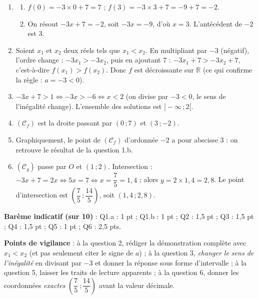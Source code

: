 \documentclass[11pt]{article}
\begin{document}
\begin{corrige}
\begin{enumerate}
\item \begin{enumerate}
\item $f(0)=-3\times 0+7=7$ ; $f(3)=-3\times 3+7=-9+7=-2$.
\item On résout $-3x+7=-2$, soit $-3x=-9$, d'où $x=3$. L'antécédent de $-2$ est $3$.
\end{enumerate}
\item Soient $x_1$ et $x_2$ deux réels tels que $x_1<x_2$. En multipliant par $-3$ (négatif), l'ordre change : $-3x_1>-3x_2$, puis en ajoutant $7$ : $-3x_1+7>-3x_2+7$, c'est-à-dire $f(x_1)>f(x_2)$. Donc $f$ est décroissante sur $\mathbb{R}$ (ce qui confirme la règle : $a=-3<0$).
\item $-3x+7>1 \iff -3x>-6 \iff x<2$ (on divise par $-3<0$, le sens de l'inégalité change). L'ensemble des solutions est $]-\infty\,;2[$.
\item $(\mathcal{C}_f)$ est la droite passant par $(0\,;7)$ et $(3\,;-2)$.
\item Graphiquement, le point de $(\mathcal{C}_f)$ d'ordonnée $-2$ a pour abscisse $3$ : on retrouve le résultat de la question 1.b.
\item $(\mathcal{C}_g)$ passe par $O$ et $(1\,;2)$. Intersection : $-3x+7=2x \iff 5x=7 \iff x=\dfrac{7}{5}=1{,}4$ ; alors $y=2\times 1{,}4=2{,}8$. Le point d'intersection est $\left(\dfrac{7}{5}\,;\dfrac{14}{5}\right)$, soit $(1{,}4\,;2{,}8)$.
\end{enumerate}

\textbf{Barème indicatif (sur 10)} : Q1.a : 1 pt ; Q1.b : 1 pt ; Q2 : 1,5 pt ; Q3 : 1,5 pt ; Q4 : 1,5 pt ; Q5 : 1 pt ; Q6 : 2,5 pts.

\textbf{Points de vigilance} : à la question 2, rédiger la démonstration complète avec $x_1<x_2$ (et pas seulement citer le signe de $a$) ; à la question 3, \emph{changer le sens de l'inégalité} en divisant par $-3$ et donner la réponse sous forme d'intervalle ; à la question 5, laisser les traits de lecture apparents ; à la question 6, donner les coordonnées \emph{exactes} $\left(\dfrac{7}{5}\,;\dfrac{14}{5}\right)$ avant la valeur décimale.
\end{corrige}
\end{document}
